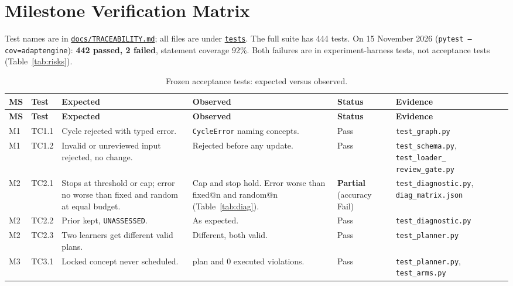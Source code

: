 \documentclass[11pt,a4paper]{article}
\newcommand{\finaltag}{cs5903-final-2026}
\newcommand{\repobase}{https://github.com/vhemanth06/AdaptEngine}
\newcommand{\repo}[1]{\href{\repobase/blob/\finaltag/#1}{\nolinkurl{#1}}}
\newcommand{\repodir}[1]{\href{\repobase/tree/\finaltag/#1}{\nolinkurl{#1}}}
\begin{document}
\section{Milestone Verification Matrix}

Test names are in \repo{docs/TRACEABILITY.md}; all files are under \repodir{tests}. The full suite has 444 tests. On 15 November 2026 (\texttt{pytest --cov=adaptengine}): \textbf{442 passed, 2 failed}, statement coverage 92\%. Both failures are in experiment-harness tests, not acceptance tests (Table~\ref{tab:risks}).

\begin{xltabular}{\textwidth}{
    @{}
    >{\raggedright\arraybackslash}p{0.07\textwidth}
    >{\raggedright\arraybackslash}p{0.08\textwidth}
    >{\raggedright\arraybackslash}X
    >{\raggedright\arraybackslash}X
    >{\raggedright\arraybackslash}p{0.08\textwidth}
    >{\raggedright\arraybackslash}p{0.21\textwidth}
    @{}
}
\caption{Frozen acceptance tests: expected versus observed.}
\label{tab:matrix}\\
\toprule
\textbf{MS} & \textbf{Test} & \textbf{Expected} & \textbf{Observed} & \textbf{Status} & \textbf{Evidence} \\
\midrule
\endfirsthead
\toprule
\textbf{MS} & \textbf{Test} & \textbf{Expected} & \textbf{Observed} & \textbf{Status} & \textbf{Evidence} \\
\midrule
\endhead
\bottomrule
\endfoot
M1 & TC1.1 & Cycle rejected with typed error. & \texttt{CycleError} naming concepts. & Pass & \texttt{test\_graph.py} \\
M1 & TC1.2 & Invalid or unreviewed input rejected, no change. & Rejected before any update. & Pass & \texttt{test\_schema.py}, \texttt{test\_loader\_} \texttt{review\_gate.py} \\
M2 & TC2.1 & Stops at threshold or cap; error no worse than fixed and random at equal budget. & Cap and stop hold. Error worse than fixed@n and random@n (Table~\ref{tab:diag}). & \textbf{Partial} (accuracy Fail) & \texttt{test\_diagnostic.py}, \texttt{diag\_matrix.json} \\
M2 & TC2.2 & Prior kept, \texttt{UNASSESSED}. & As expected. & Pass & \texttt{test\_diagnostic.py} \\
M2 & TC2.3 & Two learners get different valid plans. & Different, both valid. & Pass & \texttt{test\_planner.py} \\
M3 & TC3.1 & Locked concept never scheduled. & 0 plan and 0 executed violations. & Pass & \texttt{test\_planner.py}, \texttt{test\_arms.py} \\

\end{xltabular}
\end{document}
